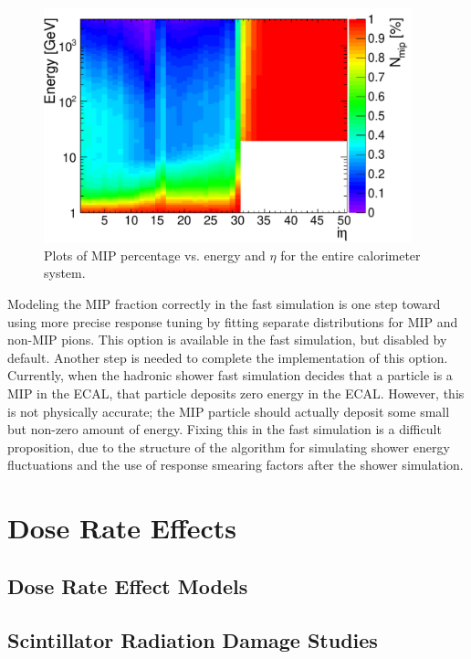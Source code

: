 \begin{figure}[hbtp]
\begin{center}
\includegraphics[width=0.95\textwidth]{figures/all_mip_interp.pdf}
\caption{Plots of MIP percentage vs. energy and $\eta$ for the entire calorimeter system.}
\label{fig:allmippct}
\end{center}
\end{figure}

Modeling the MIP fraction correctly in the fast simulation is one step toward using more precise response tuning by fitting separate distributions for MIP and non-MIP pions. This option is available in the fast simulation, but disabled by default. Another step is needed to complete the implementation of this option. Currently, when the hadronic shower fast simulation decides that a particle is a MIP in the ECAL, that particle deposits zero energy in the ECAL. However, this is not physically accurate; the MIP particle should actually deposit some small but non-zero amount of energy. Fixing this in the fast simulation is a difficult proposition, due to the structure of the algorithm for simulating shower energy fluctuations and the use of response smearing factors after the shower simulation.


\section{Dose Rate Effects}

\subsection{Dose Rate Effect Models}

\subsection{Scintillator Radiation Damage Studies}